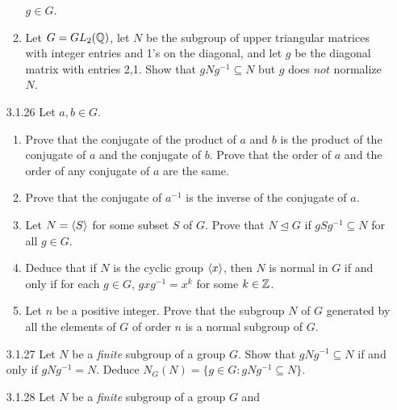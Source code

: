 \begin{enumerate}
\begin{enumerate}
                           $g \in G$.
                     \item Let $G = GL_2(\mathbb{Q})$, let $N$ be the subgroup of upper
                           triangular matrices with integer entries and 1's on
                           the diagonal, and let $g$ be the diagonal matrix with
                           entries 2,1. Show that $gNg^{-1} \subseteq N$ but $g$
                           does $\textit{not}$ normalize $N$.
                  \end{enumerate}
   \item[3.1.26]  Let $a, b \in G$.
                  \begin{enumerate}
                     \item Prove that the conjugate of the product of $a$ and
                           $b$ is the product of the conjugate of $a$ and the
                           conjugate of $b$. Prove that the order of $a$ and the
                           order of any conjugate of $a$ are the same.
                     \item Prove that the conjugate of $a^{-1}$ is the inverse
                           of the conjugate of $a$.
                     \item Let $N = \langle S \rangle$ for some subset $S$ of $G$. Prove
                           that $N \trianglelefteq G$ if $gSg^{-1} \subseteq N$
                           for all $g \in G$.
                     \item Deduce that if $N$ is the cyclic group $\langle x \rangle$,
                           then $N$ is normal in $G$ if and only if for each
                           $g \in G$, $gxg^{-1} = x^k$ for some $k \in \mathbb{Z}$.
                     \item Let $n$ be a positive integer. Prove that the
                           subgroup $N$ of $G$ generated by all the elements of
                           $G$ of order $n$ is a normal subgroup of $G$.
                  \end{enumerate}
   \item[3.1.27]  Let $N$ be a \textit{finite} subgroup of a group $G$. Show
                  that $gNg^{-1} \subseteq N$ if and only if $gNg^{-1} = N$.
                  Deduce $N_G(N) = \{g \in G : gNg^{-1} \subseteq N\}$.
   \item[3.1.28]  Let $N$ be a \textit{finite} subgroup of a group $G$ and

\end{enumerate}
